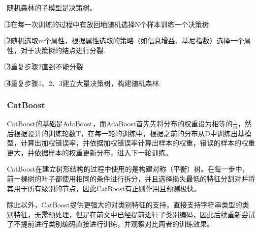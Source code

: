 \documentclass[../main.tex]{subfiles}
\begin{document}
            随机森林的子模型是决策树。
        
            \textcircled{1}在每一次训练的过程中有放回地随机选择N个样本训练一个决策树.
        
            \textcircled{2}随机选取m个属性，根据属性选取的策略（如信息增益、基尼指数）选择一个属性，对于决策树的结点进行分裂.
    
            \textcircled{3}重复步骤2直到不能分裂.
    
            \textcircled{4}重复步骤1、2、3建立大量决策树，构建随机森林.

        \subsubsection{CatBoost}

            CatBoost的基础是AdaBoost，而AdaBoost首先先将分布的权重设为相等的$\frac{1}{m}$，然后根据设计的训练轮数T，在每一轮的训练中，根据之前的分布从D中训练出基模型，计算出加权错误率，并依据加权错误率计算出样本的权重，错误的样本的权重更大，并依据样本的权重更新分布，进入下一轮训练。
        
            CatBoost在建立树形结构的过程中使用的是构建对称（平衡）树。在每一步中，前一棵树的叶子都使用相同的条件进行拆分，并且选择损失最低的特征分割对并将其用于所有级别的节点，因此CatBoost有正则作用且预测极快。

            除此以外，CatBoost提供更强大的对类别特征的支持，直接支持字符串类型的类别特征，无需预处理，但是在前文中已经提前进行了类别编码，因此后续重新尝试了不提前进行类别编码直接进行训练，并观察对比两者的训练效果。
\end{document}
